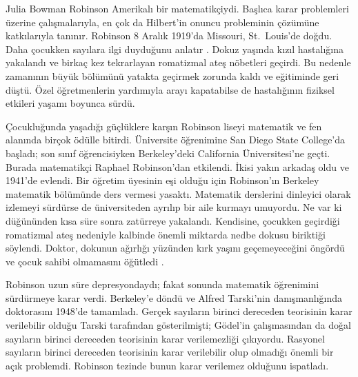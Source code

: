 




Julia Bowman Robinson Amerikalı bir matematikçiydi. Başlıca karar problemleri
üzerine çalışmalarıyla, en çok da Hilbert'in onuncu probleminin çözümüne
katkılarıyla tanınır. Robinson 8 Aralık 1919'da Missouri, St.~Louis'de doğdu.
Daha çocukken sayılara ilgi duyduğunu anlatır \citep[4]{Reid1986}. Dokuz
yaşında kızıl hastalığına yakalandı ve birkaç kez tekrarlayan romatizmal ateş
nöbetleri geçirdi. Bu nedenle zamanının büyük bölümünü yatakta geçirmek
zorunda kaldı ve eğitiminde geri düştü. Özel öğretmenlerin yardımıyla arayı
kapatabilse de hastalığının fiziksel etkileri yaşamı boyunca sürdü.

Çocukluğunda yaşadığı güçlüklere karşın Robinson liseyi matematik ve fen
alanında birçok ödülle bitirdi. Üniversite öğrenimine San Diego State
College'da başladı; son sınıf öğrencisiyken Berkeley'deki California
Üniversitesi'ne geçti. Burada matematikçi Raphael Robinson'dan etkilendi.
İkisi yakın arkadaş oldu ve 1941'de evlendi. Bir öğretim üyesinin eşi olduğu
için Robinson'ın Berkeley matematik bölümünde ders vermesi yasaktı. Matematik
derslerini dinleyici olarak izlemeyi sürdürse de üniversiteden ayrılıp bir
aile kurmayı umuyordu. Ne var ki düğününden kısa süre sonra zatürreye
yakalandı. Kendisine, çocukken geçirdiği romatizmal ateş nedeniyle kalbinde
önemli miktarda nedbe dokusu biriktiği söylendi. Doktor, dokunun ağırlığı
yüzünden kırk yaşını geçemeyeceğini öngördü ve çocuk sahibi olmamasını
öğütledi \citep[13]{Reid1986}.

Robinson uzun süre depresyondaydı; fakat sonunda matematik öğrenimini
sürdürmeye karar verdi. Berkeley'e döndü ve Alfred Tarski'nin danışmanlığında
doktorasını 1948'de tamamladı. Gerçek sayıların birinci dereceden teorisinin
karar verilebilir olduğu Tarski tarafından gösterilmişti; G\"odel'in
çalışmasından da doğal sayıların birinci dereceden teorisinin karar
verilemezliği çıkıyordu. Rasyonel sayıların birinci dereceden teorisinin
karar verilebilir olup olmadığı önemli bir açık problemdi. Robinson tezinde
\citeyearpar{Robinson1949} bunun karar verilemez olduğunu ispatladı.

